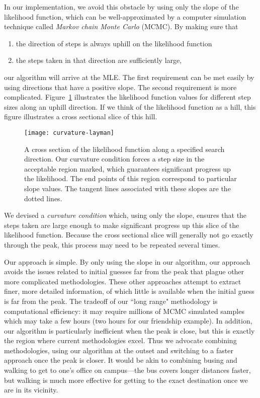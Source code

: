 \documentclass[12pt]{article}
\begin{document}
In our implementation, we avoid this obstacle by using only the slope of 
the likelihood function, which can be well-approximated by 
a computer simulation technique called \emph{Markov chain Monte Carlo} (MCMC).  
By making sure that
\begin{enumerate}
\item the direction of steps is always uphill on the likelihood function
\item the steps taken in that direction are sufficiently large,
\end{enumerate}
our algorithm will arrive at the MLE.  The first requirement can be met 
easily by using directions that have a positive slope.  The second requirement
is more complicated. 
Figure~\ref{F:curvature} illustrates the likelihood function values 
for different step sizes along an uphill direction.  
If we think of the likelihood function as a hill, this 
figure illustrates a cross sectional slice of this hill.

\begin{figure}[h!]
\centering
\texttt{[image: curvature-layman]}
\caption{A cross section of the likelihood function along a specified search direction.
Our curvature condition forces a step size in the 
acceptable region marked, which guarantees significant progress up the likelihood.
The end points of this region correspond to particular slope values.  
The tangent lines associated with these slopes are the dotted lines.
}
\label{F:curvature}
\end{figure}

We devised a \emph{curvature condition} which, using only the slope, ensures 
that the steps taken are large enough to make significant progress up this 
slice of the likelihood function.  Because the cross sectional slice will generally
not go exactly through the peak, this process may need to be repeated several times.

Our approach is simple.  By only using the slope in our algorithm, our approach avoids 
the issues related to initial guesses far from the peak that plague other 
more complicated methodologies.  These other approaches attempt to extract
finer, more detailed information, of which little is available when the initial guess is far
from the peak.
The tradeoff of our ``long range" methodology is computational efficiency:
it may require millions of MCMC simulated samples 
which may take a few hours (two hours for our friendship example). In
addition, our algorithm is particularly inefficient when the peak 
is close, but this is exactly the region
where current methodologies excel.  Thus we advocate combining methodologies, 
using our algorithm at the outset and switching 
to a faster approach once the peak is closer.  It would 
be akin to combining busing and walking to get to one's office on campus---the 
bus covers longer distances faster, but walking is much more effective for getting
to the exact destination once we are in its vicinity.
\end{document}
